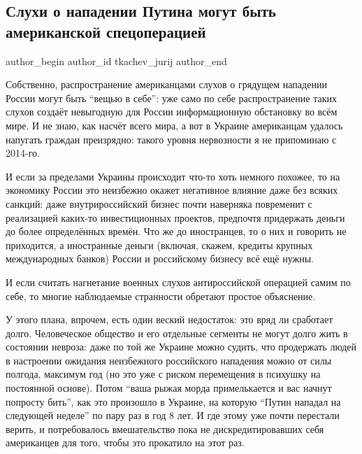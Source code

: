  
 
 
 
 
\subsection{Слухи о нападении Путина могут быть американской спецоперацией}
\label{sec:18_01_2022.tg.tkachev_jurij.1.specoperacia_amerika}

\ifcmt
 author_begin
   author_id tkachev_jurij
 author_end
\fi

Собственно, распространение американцами слухов о грядущем нападении России
могут быть \enquote{вещью в себе}: уже само по себе распространение таких слухов
создаёт невыгодную для России информационную обстановку во всём мире. И не
знаю, как насчёт всего мира, а вот в Украине американцам удалось напугать
граждан преизрядно: такого уровня нервозности я не припоминаю с 2014-го.

И если за пределами Украины происходит что-то хоть немного похожее, то на
экономику России это неизбежно окажет негативное влияние даже без всяких
санкций: даже внутрироссийский бизнес почти наверняка повременит с реализацией
каких-то инвестиционных проектов, предпочтя придержать деньги до более
определённых времён. Что же до иностранцев, то о них и говорить не приходится,
а иностранные деньги (включая, скажем, кредиты крупных международных банков)
России и российскому бизнесу всё ещё нужны.

И если считать нагнетание военных слухов антироссийской операцией самим по
себе, то многие наблюдаемые странности обретают простое объяснение.

У этого плана, впрочем, есть один веский недостаток: это вряд ли сработает
долго. Человеческое общество и его отдельные сегменты не могут долго жить в
состоянии невроза: даже по той же Украине можно судить, что продержать людей в
настроении ожидания неизбежного российского нападения можно от силы полгода,
максимум год (но это уже с риском перемещения в психушку на постоянной основе).
Потом \enquote{ваша рыжая морда примелькается и вас начнут попросту бить}, как это
произошло в Украине, на которую \enquote{Путин нападал на следующей неделе} по пару раз
в год 8 лет. И где этому уже почти перестали верить, и потребовалось
вмешательство пока не дискредитировавших себя американцев для того, чтобы это
прокатило на этот раз.

